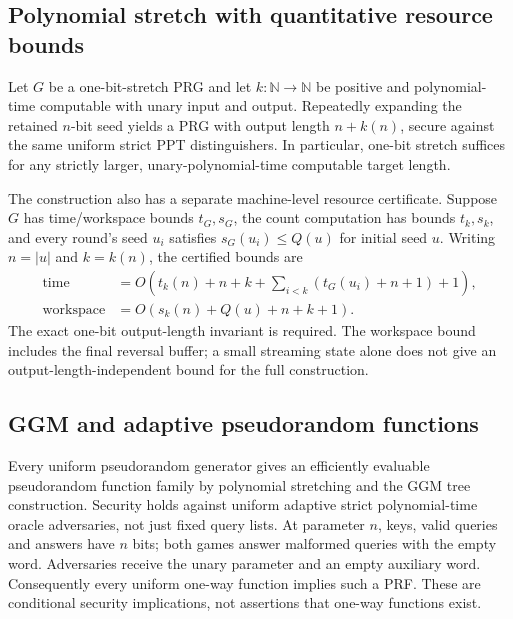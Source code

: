 \begin{result}
\subsection{Polynomial stretch with quantitative resource bounds}
Let $G$ be a one-bit-stretch PRG and let $k:\mathbb N\to\mathbb N$ be positive
and polynomial-time computable with unary input and output. Repeatedly expanding
the retained $n$-bit seed yields a PRG with output length $n+k(n)$, secure against
the same uniform strict PPT distinguishers. In particular, one-bit stretch
suffices for any strictly larger, unary-polynomial-time computable target length.
\citep{Barak2016PRG}

The construction also has a separate machine-level resource certificate.
Suppose $G$ has time/workspace bounds $t_G,s_G$, the count computation has bounds
$t_k,s_k$, and every round's seed $u_i$ satisfies $s_G(u_i)\le Q(u)$ for initial
seed $u$. Writing $n=|u|$ and $k=k(n)$, the certified bounds are
\[
\begin{aligned}
\text{time}&=O\!\left(t_k(n)+n+k+\sum_{i<k}(t_G(u_i)+n+1)+1\right),\\
\text{workspace}&=O\!\left(s_k(n)+Q(u)+n+k+1\right).
\end{aligned}
\]
The exact one-bit output-length invariant is required. The workspace bound
includes the final reversal buffer; a small streaming state alone does not give
an output-length-independent bound for the full construction.
\end{result}

\begin{result}
\subsection{GGM and adaptive pseudorandom functions}
Every uniform pseudorandom generator gives an efficiently evaluable
pseudorandom function family by polynomial stretching and the GGM tree
construction. Security holds against uniform adaptive strict polynomial-time
oracle adversaries, not just fixed query lists. At parameter $n$, keys, valid
queries and answers have $n$ bits; both games answer malformed queries with the
empty word. Adversaries receive the unary parameter and an empty auxiliary word.
Consequently every uniform
one-way function implies such a PRF. These are conditional security implications,
not assertions that one-way functions exist.\citep{GGM1986,Holenstein2006}
\end{result}

